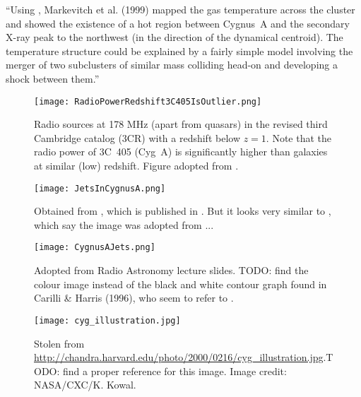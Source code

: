 \documentclass[MScProj_TLRH_ClusterEnergy.tex]{subfiles}
\begin{document}
``Using , Markevitch et al. (1999) mapped the gas temperature across the cluster and showed the existence of a hot region between Cygnus~A and the secondary X-ray peak to the northwest (in the direction of the dynamical centroid). The temperature structure could be explained by a fairly simple model involving the merger of two subclusters of similar mass colliding head-on and developing a shock between them.''


\begin{figure}[h!]
\centering
\texttt{[image: RadioPowerRedshift3C405IsOutlier.png]}
\caption{Radio sources at 178 MHz (apart from quasars) in the revised third Cambridge catalog (3CR) with a redshift below $z=1$. Note that the radio power of 3C~405 (Cyg~A) is significantly higher than galaxies at similar (low) redshift. Figure adopted from \citet{1996cyga.book....1S}.}
\label{fig:3C405RadioPowerRedshiftOutlier}
\end{figure}





\begin{figure}[ht]
\centering
\texttt{[image: JetsInCygnusA.png]}
\caption{Obtained from \citep{1996cyga.book...76C}, which is published in \citep{1996cyga.book...76C}. But it looks very similar to \citep{1996A&ARv...7....1C}, which say the image was adopted from \citep{1996cyga.book...86S}... }
\label{fig:CygAJets}
\end{figure}

\begin{figure}[ht]
\centering
\texttt{[image: CygnusAJets.png]}
\caption{Adopted from Radio Astronomy lecture slides. TODO: find the colour image instead of the black and white contour graph found in Carilli \& Harris (1996), who seem to refer to \citep{1996cyga.book...86S}.}
\label{fig:CygAJetsColour}
\end{figure}

\begin{figure}[ht]
\centering
\texttt{[image: cyg\_illustration.jpg]}
\caption{Stolen from \url{http://chandra.harvard.edu/photo/2000/0216/cyg_illustration.jpg}.TODO: find a proper reference for this image. Image credit: NASA/CXC/K. Kowal.}
\label{fig:CygAJetsColour}
\end{figure}
\end{document}

